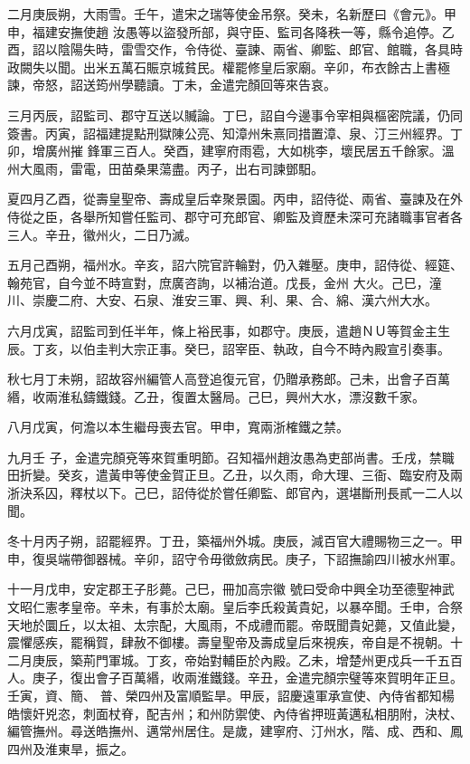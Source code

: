 \begin{pinyinscope}
 二月庚辰朔，大雨雪。壬午，遣宋之瑞等使金吊祭。癸未，名新歷曰《會元》。甲申，福建安撫使趙
 汝愚等以盜發所部，與守臣、監司各降秩一等，縣令追停。乙酉，詔以陰陽失時，雷雪交作，令侍從、臺諫、兩省、卿監、郎官、館職，各具時政闕失以聞。出米五萬石賑京城貧民。權罷修皇后家廟。辛卯，布衣餘古上書極諫，帝怒，詔送筠州學聽讀。丁未，金遣完顏回等來告哀。



 三月丙辰，詔監司、郡守互送以贓論。丁巳，詔自今邊事令宰相與樞密院議，仍同簽書。丙寅，詔福建提點刑獄陳公亮、知漳州朱熹同措置漳、泉、汀三州經界。丁卯，增廣州摧
 鋒軍三百人。癸酉，建寧府雨雹，大如桃李，壞民居五千餘家。溫州大風雨，雷電，田苗桑果蕩盡。丙子，出右司諫鄧馹。



 夏四月乙酉，從壽皇聖帝、壽成皇后幸聚景園。丙申，詔侍從、兩省、臺諫及在外侍從之臣，各舉所知嘗任監司、郡守可充郎官、卿監及資歷未深可充諸職事官者各三人。辛丑，徽州火，二日乃滅。



 五月己酉朔，福州水。辛亥，詔六院官許輪對，仍入雜壓。庚申，詔侍從、經筵、翰苑官，自今並不時宣對，庶廣咨詢，以補治道。戊長，金州
 大火。己巳，潼川、崇慶二府、大安、石泉、淮安三軍、興、利、果、合、綿、漢六州大水。



 六月戊寅，詔監司到任半年，條上裕民事，如郡守。庚辰，遣趙ＮＵ等賀金主生辰。丁亥，以伯圭判大宗正事。癸巳，詔宰臣、執政，自今不時內殿宣引奏事。



 秋七月丁未朔，詔故容州編管人高登追復元官，仍贈承務郎。己未，出會子百萬緡，收兩淮私鑄鐵錢。乙丑，復置太醫局。己巳，興州大水，漂沒數千家。



 八月戊寅，何澹以本生繼母喪去官。甲申，寬兩浙榷鐵之禁。



 九月壬
 子，金遣完顏兗等來賀重明節。召知福州趙汝愚為吏部尚書。壬戌，禁職田折變。癸亥，遣黃申等使金賀正旦。乙丑，以久雨，命大理、三衙、臨安府及兩浙決系囚，釋杖以下。己巳，詔侍從於嘗任卿監、郎官內，選堪斷刑長貳一二人以聞。



 冬十月丙子朔，詔罷經界。丁丑，築福州外城。庚辰，減百官大禮賜物三之一。甲申，復吳端帶御器械。辛卯，詔守令毋徵斂病民。庚子，下詔撫諭四川被水州軍。



 十一月戊申，安定郡王子肜薨。己巳，冊加高宗徽
 號曰受命中興全功至德聖神武文昭仁憲孝皇帝。辛未，有事於太廟。皇后李氏殺黃貴妃，以暴卒聞。壬申，合祭天地於圜丘，以太祖、太宗配，大風雨，不成禮而罷。帝既聞貴妃薨，又值此變，震懼感疾，罷稱賀，肆赦不御樓。壽皇聖帝及壽成皇后來視疾，帝自是不視朝。十二月庚辰，築荊門軍城。丁亥，帝始對輔臣於內殿。乙未，增楚州更戍兵一千五百人。庚子，復出會子百萬緡，收兩淮鐵錢。辛丑，金遣完顏宗璧等來賀明年正旦。壬寅，資、簡、
 普、榮四州及富順監旱。甲辰，詔慶遠軍承宣使、內侍省都知楊皓懷奸兇恣，刺面杖脊，配吉州；和州防禦使、內侍省押班黃邁私相朋附，決杖、編管撫州。尋送皓撫州、邁常州居住。是歲，建寧府、汀州水，階、成、西和、鳳四州及淮東旱，振之。




\end{pinyinscope}
